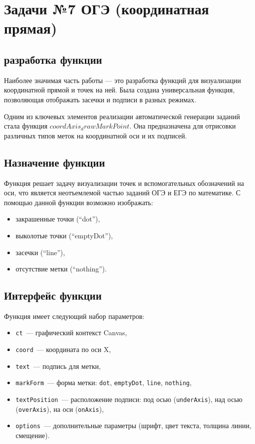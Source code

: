 \section{Задачи №7 ОГЭ (координатная прямая)}

\subsection{разработка функции}
Наиболее значимая часть работы — это разработка функций для визуализации координатной прямой и точек на ней. 
Была создана универсальная функция, позволяющая отображать засечки и подписи в разных режимах.

Одним из ключевых элементов реализации автоматической генерации заданий стала функция $coordAxis_drawMarkPoint$. Она предназначена для отрисовки различных типов меток на координатной оси и их подписей.

\subsection{Назначение функции}
Функция решает задачу визуализации точек и вспомогательных обозначений на оси,
что является неотъемлемой частью заданий ОГЭ и ЕГЭ по математике.
С помощью данной функции возможно изображать:
\begin{itemize}
    \item закрашенные точки (``dot''),
    \item выколотые точки (``emptyDot''),
    \item засечки (``line''),
    \item отсутствие метки (``nothing'').
\end{itemize}

 

\subsection{Интерфейс функции}
Функция имеет следующий набор параметров:
\begin{itemize}
    \item \texttt{ct}~--- графический контекст Canvas,
    \item \texttt{coord}~--- координата по оси X,
    \item \texttt{text}~--- подпись для метки,
    \item \texttt{markForm}~--- форма метки: \texttt{dot}, \texttt{emptyDot}, \texttt{line}, \texttt{nothing},
    \item \texttt{textPosition}~--- расположение подписи: под осью (\texttt{underAxis}), над осью (\texttt{overAxis}), на оси (\texttt{onAxis}),
    \item \texttt{options}~--- дополнительные параметры (шрифт, цвет текста, толщина линии, смещение).
\end{itemize}

